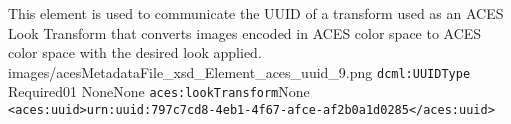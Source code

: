 		{This element is used to communicate the UUID of a transform used as an ACES Look Transform that converts images encoded in ACES color space to ACES color space with the desired look applied.}
		{images/acesMetadataFile_xsd_Element_aces_uuid_9.png}
		{\texttt{dcml:UUIDType}}
		{Required}{0}{1}
		{None}{None}
		{\texttt{aces:lookTransform}}{None}
		{\lstinline{<aces:uuid>urn:uuid:797c7cd8-4eb1-4f67-afce-af2b0a1d0285</aces:uuid>}}